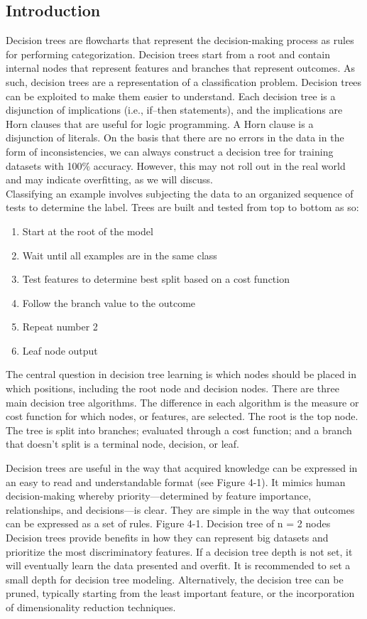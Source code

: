 \documentclass[12pt]{article}
\begin{document}
\subsection{Introduction}
Decision trees are flowcharts that represent the decision-making process as rules for performing categorization. Decision trees start from a root and contain internal nodes that represent features and branches that represent outcomes. As such, decision trees are a representation of a classification problem. Decision trees can be exploited to make them easier to understand. Each decision tree is a disjunction of implications (i.e., if–then statements), and the implications are Horn clauses that are useful for logic
programming. A Horn clause is a disjunction of literals.
On the basis that there are no errors in the data in the form of inconsistencies, we can always construct a decision tree for training datasets with 100\% accuracy. However, this may not roll out in the real world and may indicate overfitting, as we will discuss.
\\
Classifying an example involves subjecting the data to an organized sequence of tests to determine the label. Trees are built and tested from top to bottom as so:

\begin{enumerate}
\item Start at the root of the model
\item Wait until all examples are in the same class
\item Test features to determine best split based on a cost function
\item Follow the branch value to the outcome
\item Repeat number 2
\item Leaf node output
\end{enumerate}

The central question in decision tree learning is which nodes should be placed in which positions, including the root node and decision nodes. There are three main decision tree algorithms. The difference in each algorithm is the measure or cost function for which nodes, or features, are selected. The root is the top node. The tree is split into branches; evaluated through a cost function; and a branch that doesn’t split is a terminal node, decision, or leaf.

Decision trees are useful in the way that acquired knowledge can be expressed in an easy to read and understandable format (see Figure 4-1). It mimics human decision-making whereby priority—determined by feature importance, relationships, and decisions—is clear. They are simple in the way that outcomes can be expressed as a set of rules. Figure 4-1. Decision tree of n = 2 nodes
Decision trees provide benefits in how they can represent big datasets and prioritize the most discriminatory features. If a decision tree depth is not set, it will eventually learn the data presented and overfit. It is recommended to set a small depth for decision tree modeling. Alternatively, the decision tree can be pruned, typically starting from the least important feature, or the incorporation of dimensionality reduction techniques.
\end{document}
